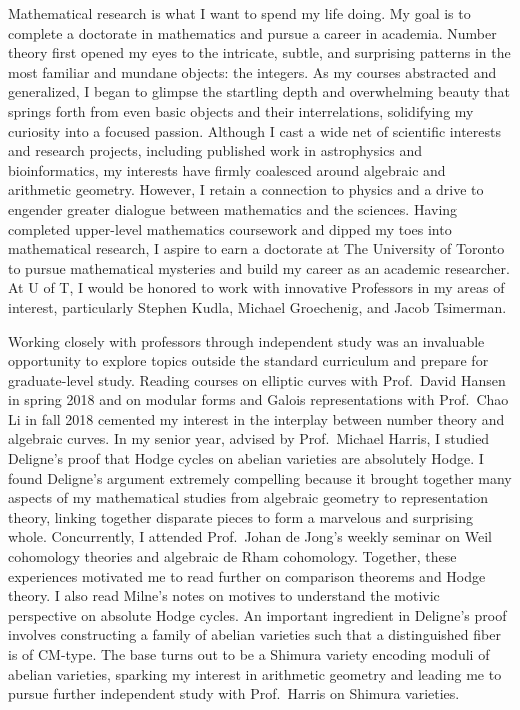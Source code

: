 \documentclass[11pt]{article}
\begin{document}
Mathematical research is what I want to spend my life doing. My goal is to complete a doctorate in mathematics and pursue a career in academia. Number theory first opened my eyes to the intricate, subtle, and surprising patterns in the most familiar and mundane objects: the integers. As my courses abstracted and generalized, I began to glimpse the startling depth and overwhelming beauty that springs forth from even basic objects and their interrelations, solidifying my curiosity into a focused passion. Although I cast a wide net of scientific interests and research projects, including published work in astrophysics and bioinformatics, my interests have firmly coalesced around algebraic and arithmetic geometry. However, I retain a connection to physics and a drive to engender greater dialogue between mathematics and the sciences. Having completed upper-level mathematics coursework and dipped my toes into mathematical research, I aspire to earn a doctorate at The University of Toronto to pursue mathematical mysteries and build my career as an academic researcher. At U of T, I would be honored to work with innovative Professors in my areas of interest, particularly Stephen Kudla, Michael Groechenig, and Jacob Tsimerman.
\par
Working closely with professors through independent study was an invaluable opportunity to explore topics outside the standard curriculum and prepare for graduate-level study. 
Reading courses on elliptic curves with Prof.\ David Hansen in spring 2018 and on modular forms and Galois representations with Prof.\ Chao Li in fall 2018 cemented my interest in the interplay between number theory and algebraic curves. In my senior year, advised by Prof.\ Michael Harris, I studied Deligne's proof that Hodge cycles on abelian varieties are absolutely Hodge. I found Deligne's argument extremely compelling because it brought together many aspects of my mathematical studies from algebraic geometry to representation theory, linking together disparate pieces to form a marvelous and surprising whole. Concurrently, I attended Prof.\ Johan de Jong's weekly seminar on Weil cohomology theories and algebraic de Rham cohomology. Together, these experiences motivated me to read further on comparison theorems and Hodge theory. I also read Milne's notes on motives to understand the motivic perspective on absolute Hodge cycles. An important ingredient in Deligne's proof involves constructing a family of abelian varieties such that a distinguished fiber is of CM-type. The base turns out to be a Shimura variety encoding moduli of abelian varieties, sparking my interest in arithmetic geometry and leading me to pursue further independent study with Prof.\ Harris on Shimura varieties.
\end{document}
